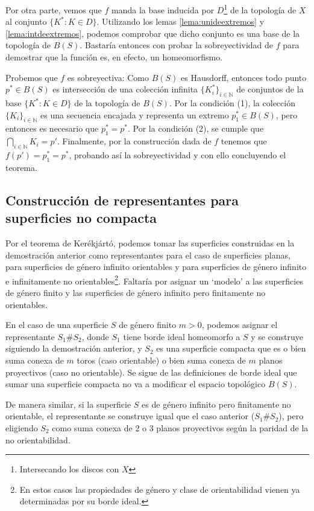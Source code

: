 \documentclass[a4paper,11pt,spanish, twoside, leqno]{tfg-uam}
\theoremstyle{definition}
\begin{document}
Por otra parte, vemos que $f$ manda la base inducida por $D$\footnote{Intersecando los discos con $X$} de la topología de $X$ al conjunto $\{K^*: K\in D\}$. Utilizando los lemas \ref{lema:unideextremos} y \ref{lema:intdeextremos}, podemos comprobar que dicho conjunto es una base de la topología de $B(S)$. Bastaría entonces con probar la sobreyectividad de $f$ para demostrar que la función es, en efecto, un homeomorfismo.

Probemos que $f$ es sobreyectiva: Como $B(S)$ es Hausdorff, entonces todo punto $p^* \in B(S)$ es intersección de una colección infinita $\{K_i^*\}_{i\in\mathbb{N}}$ de conjuntos de la base $\{K^*: K\in D\}$ de la topología de $B(S)$. Por la condición (1), la colección $\{K_i\}_{i\in\mathbb{N}}$ es una secuencia encajada y representa un extremo $p_1^* \in B(S)$, pero entonces es necesario que $p_1^* = p^*$.  Por la condición (2), se cumple que $\bigcap_{i\in\mathbb{N}} K_i = {p'}$. Finalmente, por la construcción dada de $f$ tenemos que $f(p') = p_1^* = p^*$, probando así la sobreyectividad y con ello concluyendo el teorema.


\subsection{Construcción de representantes para superficies no compacta}

Por el teorema de Kerékjártó, podemos tomar las superficies construidas en la demostración anterior como representantes para el caso de superficies planas, para superficies de género infinito orientables y para superficies de género infinito e infinitamente no orientables\footnote{En estos casos las propiedades de género y clase de orientabilidad vienen ya determinadas por su borde ideal.}. Faltaría por asignar un `modelo' a las superficies de género finito y las superficies de género infinito pero finitamente no orientables.

En el caso de una superficie $S$ de género finito $m>0$, podemos asignar el representante $S_1\# S_2$, donde $S_1$ tiene borde ideal homeomorfo a $S$ y se construye siguiendo la demostración anterior, y $S_2$ es una superficie compacta que es o bien suma conexa de $m$ toros (caso orientable) o bien suma conexa de $m$ planos proyectivos (caso no orientable). Se sigue de las definiciones de borde ideal que sumar una superficie compacta no va a modificar el espacio topológico $B(S)$.

De manera similar, si la superficie $S$ es de género infinito pero finitamente no orientable, el representante se construye igual que el caso anterior ($S_1\# S_2$), pero eligiendo $S_2$ como suma conexa de 2 o 3 planos proyectivos según la paridad de la no orientabilidad.
\end{document}

